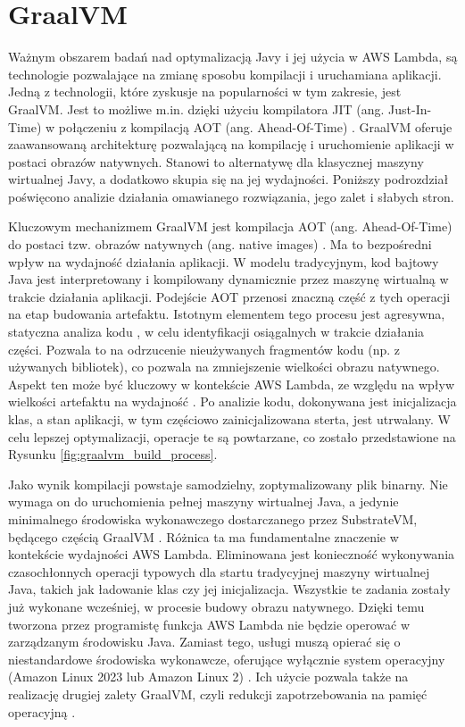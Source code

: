 \section{GraalVM}\label{chapter:graalvm}

Ważnym obszarem badań nad optymalizacją Javy i jej użycia w AWS Lambda, są technologie pozwalające na zmianę sposobu kompilacji i uruchamiana aplikacji.
Jedną z technologii, które zyskusje na popularności w tym zakresie, jest GraalVM.
Jest to możliwe m.in. dzięki użyciu kompilatora JIT (ang. Just-In-Time) w połączeniu z kompilacją AOT (ang. Ahead-Of-Time) \cite{8756917}.
GraalVM oferuje zaawansowaną architekturę pozwalającą na kompilację i uruchomienie aplikacji w postaci obrazów natywnych.
Stanowi to alternatywę dla klasycznej maszyny wirtualnej Javy, a dodatkowo skupia się na jej wydajności.
Poniższy podrozdział poświęcono analizie działania omawianego rozwiązania, jego zalet i słabych stron.

Kluczowym mechanizmem GraalVM jest kompilacja AOT (ang. Ahead-Of-Time) do postaci tzw. obrazów natywnych (ang. native images) \cite{8756917}.
Ma to bezpośredni wpływ na wydajność działania aplikacji.
W modelu tradycyjnym, kod bajtowy Java jest interpretowany i kompilowany dynamicznie przez maszynę wirtualną w trakcie działania aplikacji.
Podejście AOT przenosi znaczną część z tych operacji na etap budowania artefaktu. 
Istotnym elementem tego procesu jest agresywna, statyczna analiza kodu \cite{9245290}, w celu identyfikacji osiągalnych w trakcie działania części.
Pozwala to na odrzucenie nieużywanych fragmentów kodu (np. z używanych bibliotek), co pozwala na zmniejszenie wielkości obrazu natywnego.
Aspekt ten może być kluczowy w kontekście AWS Lambda, ze względu na wpływ wielkości artefaktu na wydajność \cite{8116416}.
Po analizie kodu, dokonywana jest inicjalizacja klas, a stan aplikacji, w tym częściowo zainicjalizowana sterta, jest utrwalany.
W celu lepszej optymalizacji, operacje te są powtarzane, co zostało przedstawione na Rysunku \ref{fig:graalvm_build_process}.

Jako wynik kompilacji powstaje samodzielny, zoptymalizowany plik binarny.
Nie wymaga on do uruchomienia pełnej maszyny wirtualnej Java, a jedynie minimalnego środowiska wykonawczego dostarczanego przez SubstrateVM, będącego częścią GraalVM \cite{8756917}.
Różnica ta ma fundamentalne znaczenie w kontekście wydajności AWS Lambda.
Eliminowana jest konieczność wykonywania czasochłonnych operacji typowych dla startu tradycyjnej maszyny wirtualnej Java, takich jak ładowanie klas czy jej inicjalizacja.
Wszystkie te zadania zostały już wykonane wcześniej, w procesie budowy obrazu natywnego.
Dzięki temu tworzona przez programistę funkcja AWS Lambda nie będzie operować w zarządzanym środowisku Java.
Zamiast tego, usługi muszą opierać się o niestandardowe środowiska wykonawcze, oferujące wyłącznie system operacyjny (Amazon Linux 2023 lub Amazon Linux 2) \cite{awsLambdaDeveloperGuide}.
Ich użycie pozwala także na realizację drugiej zalety GraalVM, czyli redukcji zapotrzebowania na pamięć operacyjną \cite{9245290}.

